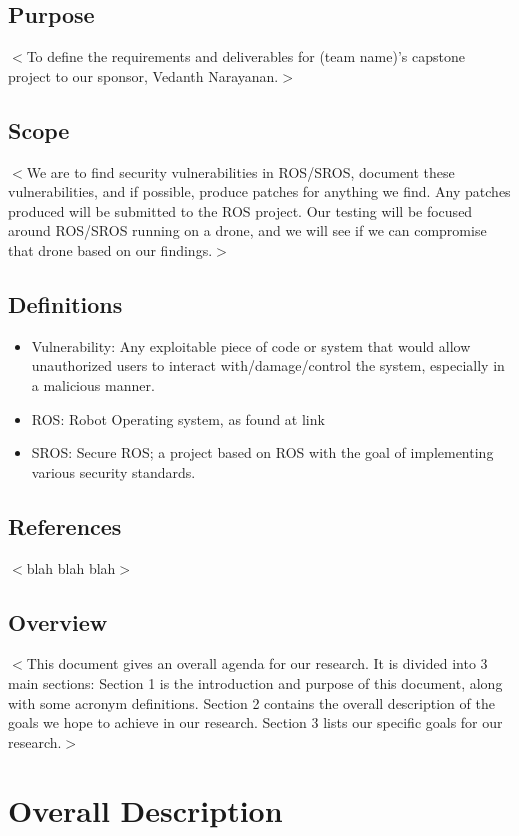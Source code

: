 \documentclass{scrreprt}
\begin{document}
\section{Purpose}
$<$To define the requirements and deliverables for (team name)'s capstone project to our sponsor, Vedanth Narayanan.$>$

\section{Scope}
$<$We are to find security vulnerabilities in ROS/SROS, document these vulnerabilities, and if possible, produce patches for anything we find. Any patches produced will be submitted to the ROS project. Our testing will be focused around ROS/SROS running on a drone, and we will see if we can compromise that drone based on our findings.$>$

\section{Definitions}
\begin{itemize}
  \item Vulnerability: Any exploitable piece of code or system that would allow unauthorized users to interact with/damage/control the system, especially in a malicious manner.
  \item ROS: Robot Operating system, as found at link
  \item SROS: Secure ROS; a project based on ROS with the goal of implementing various security standards.
\end{itemize}

\section{References}
$<$blah blah blah$>$

\section{Overview}
$<$This document gives an overall agenda for our research. It is divided into 3 main sections:
Section 1 is the introduction and purpose of this document, along with some acronym definitions.
Section 2 contains the overall description of the goals we hope to achieve in our research.
Section 3 lists our specific goals for our research.$>$


\chapter{Overall Description}
\end{document}
